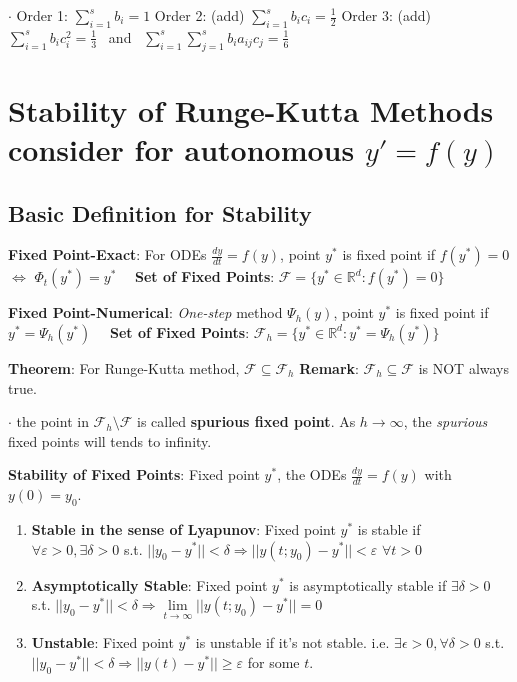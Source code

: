 \documentclass[9pt]{article}
\begin{document}
$\cdot$ Order 1: $\sum_{i=1}^{s}b_i=1$ \qquad Order 2: { (add)} $\sum_{i=1}^{s}b_ic_i=\frac{1}{2}$ \qquad Order 3: { (add)} $\sum_{i=1}^{s}b_ic_i^2=\frac{1}{3}$ \ and \ $\sum_{i=1}^{s}\sum_{j=1}^{s}b_ia_{ij}c_j=\frac{1}{6}$


\section{Stability of Runge-Kutta Methods {\scriptsize consider for autonomous $y'=f(y)$}} %

\subsection{Basic Definition for Stability} %

\textbf{Fixed Point-Exact}: For ODEs $\frac{dy}{dt}=f(y)$, point $y^*$ is fixed point if $f(y^*)=0$ $\Leftrightarrow$ $\Phi_t(y^*)=y^*$ {\footnotesize \ \ \textbf{Set of Fixed Points}: $\mathcal{F}=\{y^*\in\mathbb{R}^d:f(y^*)=0\}$}

\textbf{Fixed Point-Numerical}: \textit{One-step} method $\Psi_h(y)$, point $y^*$ is fixed point if $y^*=\Psi_h(y^*)$ {\footnotesize \ \ \textbf{Set of Fixed Points}: $\mathcal{F}_h=\{y^*\in\mathbb{R}^d:y^*=\Psi_h(y^*)\}$}

\textbf{Theorem}: For Runge-Kutta method, $\mathcal{F}\subseteq\mathcal{F}_h$ \qquad \qquad \textbf{Remark}: $\mathcal{F}_h\subseteq\mathcal{F}$ is NOT always true.

$\cdot$ the point in $\mathcal{F}_h\setminus\mathcal{F}$ is called \textbf{spurious fixed point}. \qquad \qquad As $h\to\infty$, the \textit{spurious} fixed points will tends to infinity.

\textbf{Stability of Fixed Points}: Fixed point $y^*$, the ODEs $\frac{dy}{dt}=f(y)$ with $y(0)=y_0$.
\begin{enumerate}[itemsep=-2pt, topsep=-2pt]
    \item \textbf{Stable in the sense of Lyapunov}: Fixed point $y^*$ is stable if $\forall \varepsilon>0,\exists \delta>0$ s.t. $||y_0-y^*||<\delta\Rightarrow||y(t;y_0)-y^*||<\varepsilon$ $\forall t>0$
    \item \textbf{Asymptotically Stable}: Fixed point $y^*$ is asymptotically stable if $\exists \delta>0$ s.t. $||y_0-y^*||<\delta\Rightarrow\lim\limits_{t\to\infty}||y(t;y_0)-y^*||=0$
    \item \textbf{Unstable}: Fixed point $y^*$ is unstable if it's not stable. \quad i.e. $\exists \epsilon>0,\forall \delta>0$ s.t. $||y_0-y^*||<\delta\Rightarrow||y(t)-y^*||\geq\varepsilon$ for some $t$.
\end{enumerate}
\end{document}

